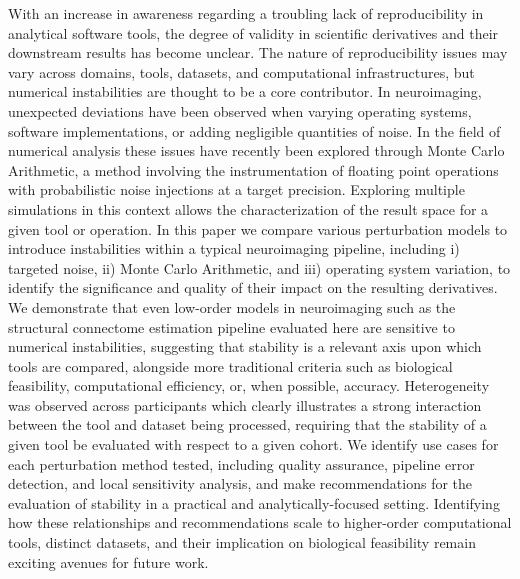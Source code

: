 With an increase in awareness regarding a troubling lack of reproducibility in analytical software tools, the degree of
validity in scientific derivatives and their downstream results has become unclear. The nature of reproducibility
issues may vary across domains, tools, datasets, and computational infrastructures, but numerical instabilities are
thought to be a core contributor. In neuroimaging, unexpected deviations have been observed when varying operating
systems, software implementations, or adding negligible quantities of noise. In the field of numerical analysis these
issues have recently been explored through Monte Carlo Arithmetic, a method involving the instrumentation of floating
point operations with probabilistic noise injections at a target precision. Exploring multiple simulations in this
context allows the characterization of the result space for a given tool or operation. In this paper we compare various
perturbation models to introduce instabilities within a typical neuroimaging pipeline, including i) targeted noise,
ii) Monte Carlo Arithmetic, and iii) operating system variation, to identify the significance and quality of their
impact on the resulting derivatives. We demonstrate that even low-order models in neuroimaging such as the structural
connectome estimation pipeline evaluated here are sensitive to numerical instabilities, suggesting that stability is a
relevant axis upon which tools are compared, alongside more traditional criteria such as biological feasibility,
computational efficiency, or, when possible, accuracy. Heterogeneity was observed across participants which clearly
illustrates a strong interaction between the tool and dataset being processed, requiring that the stability of a given
tool be evaluated with respect to a given cohort. We identify use cases for each perturbation method tested, including
quality assurance, pipeline error detection, and local sensitivity analysis, and make recommendations for the
evaluation of stability in a practical and analytically-focused setting. Identifying how these relationships and
recommendations scale to higher-order computational tools, distinct datasets, and their implication on biological
feasibility remain exciting avenues for future work.

